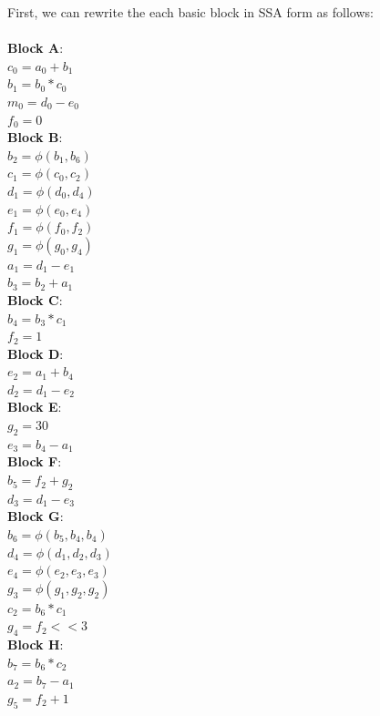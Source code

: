 \documentclass[11pt]{article}
\begin{document}
\begin{enumerate}
\begin{Answer}
		      First, we can rewrite the each basic block in SSA form as follows: \\ \\
		      \textbf{Block A}: \\
		      $c_0 = a_0 + b_1$ \\
		      $b_1 = b_0 * c_0$ \\
		      $m_0 = d_0 - e_0$ \\
		      $f_0 = 0$ \\
		      \textbf{Block B}: \\
		      $b_2 = \phi(b_1, b_6)$ \\
		      $c_1 = \phi(c_0, c_2)$ \\
		      $d_1 = \phi(d_0, d_4)$ \\
		      $e_1 = \phi(e_0, e_4)$ \\
		      $f_1 = \phi(f_0, f_2)$ \\
		      $g_1 = \phi(g_0, g_4)$ \\
		      $a_1 = d_1 - e_1$ \\
		      $b_3 = b_2 + a_1$ \\
		      \textbf{Block C}: \\
		      $b_4 = b_3 * c_1$ \\
		      $f_2 = 1$ \\
		      \textbf{Block D}: \\
		      $e_2 = a_1 + b_4$ \\
		      $d_2 = d_1 - e_2$ \\
		      \textbf{Block E}: \\
		      $g_2 = 30$ \\
		      $e_3 = b_4 - a_1$ \\
		      \textbf{Block F}: \\
		      $b_5 = f_2 + g_2$ \\
		      $d_3 = d_1 - e_3$ \\
		      \textbf{Block G}: \\
		      $b_6 = \phi(b_5, b_4, b_4)$ \\
		      $d_4 = \phi(d_1, d_2, d_3)$ \\
		      $e_4 = \phi(e_2, e_3, e_3)$ \\
		      $g_3 = \phi(g_1, g_2, g_2)$ \\
		      $c_2 = b_6 * c_1$ \\
		      $g_4 = f_2 << 3$ \\
		      \textbf{Block H}: \\
		      $b_7 = b_6 * c_2$ \\
		      $a_2 = b_7 - a_1$ \\
		      $g_5 = f_2 + 1$ \\



\end{Answer}
\end{enumerate}
\end{document}

